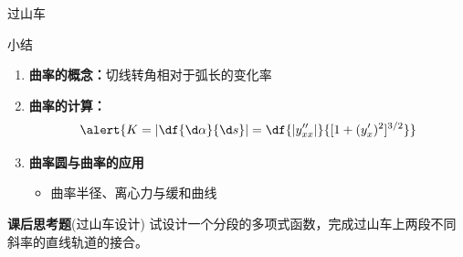 \begin{frame}{过山车}
	\linespread{1.2}
	\vspace{-1ex}
	\begin{center}
		\hspace{1em}
	\end{center}
\end{frame}

\begin{frame}[<+->]{小结}
	\linespread{1.2}
	\begin{enumerate}
	  \item {\bf 曲率的概念：}切线转角相对于弧长的变化率
	  \item {\bf 曲率的计算：}
	  $$\alert{K=\left|\df{\d\alpha}{\d s}\right|
				=\df{|y''_{xx}|}{[1+(y'_x)^2]^{3/2}}}$$
	  \item {\bf 曲率圆与曲率的应用}
	  \begin{itemize}
	    \item 曲率半径、离心力与缓和曲线
	  \end{itemize}
	\end{enumerate}
	\begin{exampleblock}{{\bf 课后思考题}(过山车设计)\hfill}
		试设计一个分段的多项式函数，完成过山车上两段不同斜率的直线轨道的接合。
	\end{exampleblock}
\end{frame}

